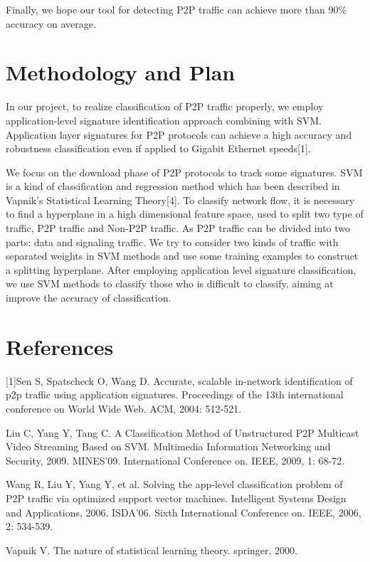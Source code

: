 \documentclass[10pt, a4paper, onecolumn, fleqn]{article}
\begin{document}
\noindent
Finally, we hope our tool for detecting P2P traffic can achieve more than 90\% accuracy on average.



\section{Methodology and Plan}
In our project, to realize classification of P2P traffic properly, 
we employ application-level signature identification approach combining with SVM. 
Application layer signatures for P2P protocols can achieve a high accuracy and robustness classification 
even if applied to Gigabit Ethernet speeds[1].     

\noindent
We focus on the download phase of P2P protocols to track some signatures. 
SVM is a kind of classification and regression method which has been described in Vapnik’s Statistical Learning Theory[4]. 
To classify network flow, it is necessary to find a hyperplane in a high dimensional feature space, 
used to split two type of traffic, P2P traffic and Non-P2P traffic. 
As P2P traffic can be divided into two parts: data and signaling traffic. 
We try to consider two kinds of traffic with separated weights in SVM methods and 
use some training examples to construct a splitting hyperplane. 
After employing application level signature classification, 
we use SVM methods to classify those who is difficult to classify, 
aiming at improve the accuracy of classification.




\section{References}
[1]Sen S, Spatscheck O, Wang D. 
Accurate, scalable in-network identification of p2p traffic using application signatures.
Proceedings of the 13th international conference on World Wide Web. ACM, 2004: 512-521.

%
%
\noindent
[2]Liu C, Yang Y, Tang C. 
A Classification Method of Unstructured P2P Multicast Video Streaming Based on SVM.
Multimedia Information Networking and Security, 2009. MINES'09. International Conference on. IEEE, 2009, 1: 68-72.

\noindent
[3]Wang R, Liu Y, Yang Y, et al. 
Solving the app-level classification problem of P2P traffic via optimized support vector machines. 
Intelligent Systems Design and Applications, 2006. ISDA'06. Sixth International Conference on. IEEE, 2006, 2: 534-539.

\noindent
[4]Vapnik V. 
The nature of statistical learning theory.
springer, 2000.
\end{document}
